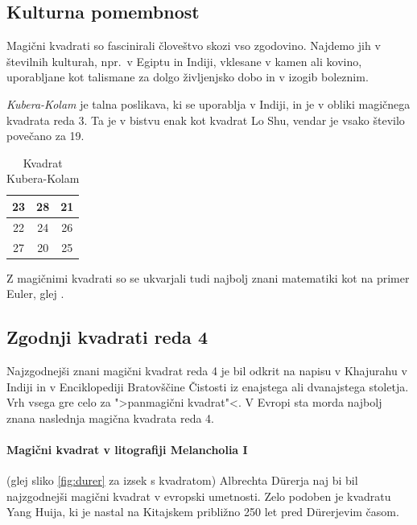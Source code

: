 \documentclass[a4paper,12pt]{article}
\newenvironment{magic}[3]
{
   \begin{table}[!ht]
   \centering
   \caption{#2}
   \label{#3}
   \large
   \begin{tabular}{|*{#1}{c|}}
   \hline
}
{
   \end{tabular}
    \normalsize
\end{table}
}
\theoremstyle{definition}
\theoremstyle{plain}
\begin{document}

\subsection{Kulturna pomembnost}

Magični kvadrati so fascinirali človeštvo skozi vso zgodovino. Najdemo jih
v številnih kulturah, npr.\ v Egiptu in Indiji, vklesane v kamen ali
kovino, uporabljane kot talismane za dolgo življenjsko dobo in v
izogib boleznim.

\emph{Kubera-Kolam} je talna poslikava, ki se uporablja v Indiji, in je v
obliki magičnega kvadrata reda 3. Ta je v bistvu enak kot kvadrat
Lo Shu, vendar je vsako število povečano za 19.

\begin{magic}{3}{Kvadrat Kubera-Kolam}{table:kubera}
   23 & 28 & 21 \\ \hline
   22 & 24 & 26 \\ \hline
   27 & 20 & 25 \\ \hline
   \end{magic}

Z magičnimi kvadrati so se ukvarjali tudi najbolj znani matematiki kot na
primer Euler, glej \cite{euler}.


\subsection{Zgodnji kvadrati reda 4}

Najzgodnejši znani magični kvadrat reda 4 je bil odkrit na napisu
v Khajurahu v Indiji in v Enciklopediji Bratovščine Čistosti iz enajstega
ali dvanajstega stoletja. Vrh vsega gre celo za ">panmagični kvadrat"<.
V Evropi sta morda najbolj znana naslednja magična kvadrata reda 4.

\paragraph{Magični kvadrat v litografiji Melancholia I}
(glej sliko \ref{fig:durer}
za izsek s kvadratom) Albrechta Dürerja naj bi bil najzgodnejši magični kvadrat
v evropski umetnosti. Zelo podoben je kvadratu Yang Huija, ki je nastal na Kitajskem
približno 250 let pred Dürerjevim časom. %
\end{document}
